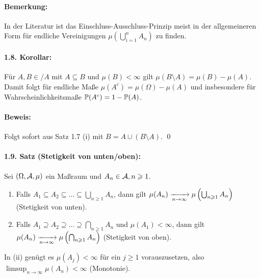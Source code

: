 \documentclass[12pt]{report}
\begin{document}
\paragraph{Bemerkung:}In der Literatur ist das Einschluss-Ausschluss-Prinzip meist in der allgemeineren Form f\"ur endliche Vereinigungen $\mu\left(\bigcup_{i=1}^nA_n\right)$ zu finden.

\paragraph{1.8. Korollar:}F\"ur $A,B\in/A$ mit $A\subseteq B$ und $\mu(B)<\infty$ gilt $\mu(B\setminus A)=\mu(B)-\mu(A)$. Damit folgt f\"ur endliche Ma\ss{}e $\mu(A^c)=\mu(\Omega)-\mu(A)$ und insbesondere f\"ur Wahrscheinlichkeitsma\ss{}e $\mathbb{P}(A^c)=1-\mathbb{P}(A)$.

\paragraph{Beweis:}Folgt sofort aus Satz 1.7 (i) mit $B=A\cup (B\setminus A)$. \qed

\paragraph{1.9. Satz (Stetigkeit von unten/oben):}Sei $(\Omega,\mathcal{A},\mu)$ ein Ma\ss{}raum und $A_n\in\mathcal{A},n\geqslant1$.
\begin{enumerate}[label=(\roman*)]
    \item Falls $A_1\subseteq A_2\subseteq\hdots\subseteq\bigcup_{n\geq1}A_n$, dann gilt $\mu(A_n)\nto{}{n\to\infty}\mu\left(\bigcup_{n\geq1}A_n\right)$ (Stetigkeit von unten).
    \item Falls $A_1\supseteq A_2\supseteq\hdots\supseteq\bigcap_{n\geq1}A_n$ und $\mu(A_1)<\infty$, dann gilt $\mu(A_n)\nto{}{n\to\infty}\mu\left(\bigcap_{n\geq1}A_n\right)$ (Stetigkeit von oben).
\end{enumerate}
In (ii) gen\"ugt es $\mu(A_j)<\infty$ f\"ur ein $j\geq1$ vorauszusetzen, also $\limsup_{n\to\infty}\mu(A_n)<\infty$ (Monotonie).
\end{document}
